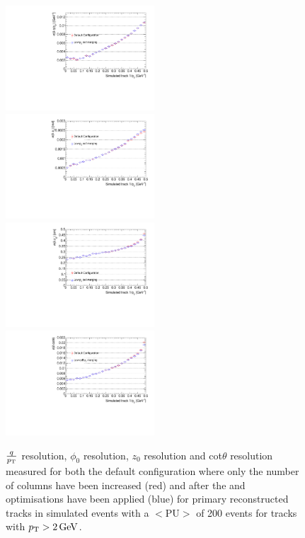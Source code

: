 \begin{figure}[htb]
\centering
\includegraphics[width=0.495\textwidth]{figs/tk-upgrade/results-lowPtTracking/qOverPtResVsInvPtFlatGeometry_5000.pdf}
\includegraphics[width=0.495\textwidth]{figs/tk-upgrade/results-lowPtTracking/phi0ResVsInvPtFlatGeometry_5000.pdf}
\\
\includegraphics[width=0.495\textwidth]{figs/tk-upgrade/results-lowPtTracking/z0ResVsInvPtFlatGeometry_5000.pdf}
\includegraphics[width=0.495\textwidth]{figs/tk-upgrade/results-lowPtTracking/cotThetaResVsInvPtFlatGeometry_5000.pdf}
\caption{
$\frac{q}{p_{\mathrm{T}}}$ resolution, $\phi_{0}$ resolution, $z_{0}$ resolution and cot$\theta$ resolution measured for both the default configuration where only the number of \HT \qpt columns have been increased (red) and after the \HT and \KF optimisations have been applied (blue) for primary reconstructed tracks in simulated \ttbar events with a $<\textrm{PU}>$ of 200 events for tracks with $p_{\mathrm{T}} > 2\,\text{Ge\hspace{-.08em}V}$.
}
\label{fig:htHelixParametersResVsInvPt}
\end{figure}

